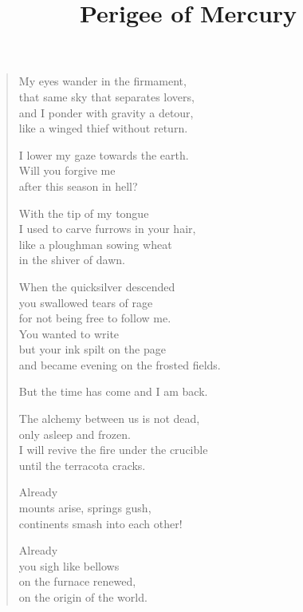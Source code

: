 \documentclass[twocolumn,12pt]{article}
\title{Perigee of Mercury}
\author{}
\date{}
\begin{document}
\maketitle

\thispagestyle{empty}



\bigskip

\begin{verse}%
  My eyes wander in the firmament, \\
  that same sky that separates lovers, \\
  and I ponder with gravity a detour, \\
  like a winged thief without return.

  I lower my gaze towards the earth. \\
  Will you forgive me \\
  after this season in hell?

  With the tip of my tongue \\
  I used to carve furrows in your hair, \\
  like a ploughman sowing wheat \\
  in the shiver of dawn.

  When the quicksilver descended \\
  you swallowed tears of rage \\
  for not being free to follow me. \\
  You wanted to write \\
  but your ink spilt on the page \\
  and became evening on the frosted fields.

  But the time has come and I am back.

  The alchemy between us is not dead, \\
  only asleep and frozen. \\
  I will revive the fire under the crucible \\
  until the terracota cracks.

  \newpage

  Already \\
  mounts arise, springs gush, \\
  continents smash into each other!

  Already \\
  you sigh like bellows \\
  on the furnace renewed, \\
  on the origin of the world.


\end{verse}
\end{document}
